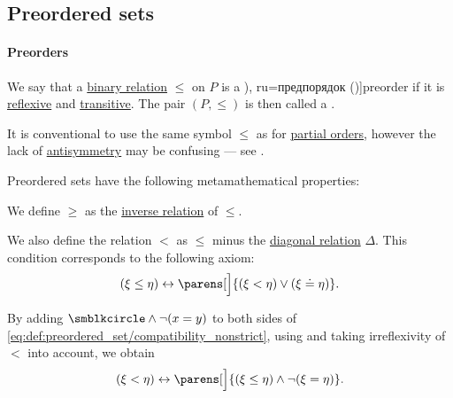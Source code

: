 \subsection{Preordered sets}\label{subsec:preordered_sets}

\paragraph{Preorders}

\begin{definition}\label{def:preordered_set}
  We say that a \hyperref[def:binary_relation]{binary relation} \( \leq \) on \( P \) is a \term[bg=преднаредба (\cite[9]{Проданов1982}), ru=предпорядок (\cite[def 3.1]{Гуров2013})]{preorder} if it is \hyperref[def:binary_relation/reflexive]{reflexive} and \hyperref[def:binary_relation/transitive]{transitive}. The pair \( (P, \leq) \) is then called a .

  It is conventional to use the same symbol \( \leq \) as for \hyperref[def:partially_ordered_set]{partial orders}, however the lack of \hyperref[def:binary_relation/antisymmetric]{antisymmetry} may be confusing --- see .

  Preordered sets have the following metamathematical properties:
  \begin{thmenum}[series=def:preordered_set]
     We define \( \geq \) as the \hyperref[def:binary_relation/inverse]{inverse relation} of \( \leq \).

     We also define the relation \( < \) as \( \leq \) minus the \hyperref[def:binary_relation/diagonal]{diagonal relation} \( \Delta \). This condition corresponds to the following axiom:
    \begin{equation}\label{eq:def:preordered_set/compatibility_nonstrict}
      (\xi \leq \eta) \leftrightarrow \parens[\Big]{(\xi < \eta) \vee (\xi \doteq \eta)}.
    \end{equation}

    By adding \( \anon \wedge \neg (x = y) \) to both sides of \eqref{eq:def:preordered_set/compatibility_nonstrict}, using  and taking irreflexivity of \( < \) into account, we obtain
    \begin{equation}\label{eq:def:preordered_set/compatibility_strict}
      (\xi < \eta) \leftrightarrow \parens[\Big]{(\xi \leq \eta) \wedge \neg (\xi = \eta)}.
    \end{equation}


\end{thmenum}
\end{definition}
